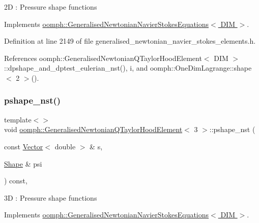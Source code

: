 2D \+: Pressure shape functions 

Implements \hyperlink{classoomph_1_1GeneralisedNewtonianNavierStokesEquations_a84735d21f3d1ade819726a71a7b462e1}{oomph\+::\+Generalised\+Newtonian\+Navier\+Stokes\+Equations$<$ D\+I\+M $>$}.



Definition at line 2149 of file generalised\+\_\+newtonian\+\_\+navier\+\_\+stokes\+\_\+elements.\+h.



References oomph\+::\+Generalised\+Newtonian\+Q\+Taylor\+Hood\+Element$<$ D\+I\+M $>$\+::dpshape\+\_\+and\+\_\+dptest\+\_\+eulerian\+\_\+nst(), i, and oomph\+::\+One\+Dim\+Lagrange\+::shape$<$ 2 $>$().

\mbox{\label{classoomph_1_1GeneralisedNewtonianQTaylorHoodElement_aafeab4cbc9e3a7873959357b98fe475c}} 
\subsubsection{\texorpdfstring{pshape\+\_\+nst()}{pshape\_nst()}\hspace{0.1cm}{\footnotesize\ttfamily [4/4]}}
{\footnotesize\ttfamily template$<$$>$ \\
void \hyperlink{classoomph_1_1GeneralisedNewtonianQTaylorHoodElement}{oomph\+::\+Generalised\+Newtonian\+Q\+Taylor\+Hood\+Element}$<$ 3 $>$\+::pshape\+\_\+nst (\begin{DoxyParamCaption}\item[{const \hyperlink{classoomph_1_1Vector}{Vector}$<$ double $>$ \&}]{s,  }\item[{\hyperlink{classoomph_1_1Shape}{Shape} \&}]{psi }\end{DoxyParamCaption}) const\hspace{0.3cm}{\ttfamily [inline]}, {\ttfamily [virtual]}}

3D \+: Pressure shape functions 

Implements \hyperlink{classoomph_1_1GeneralisedNewtonianNavierStokesEquations_a84735d21f3d1ade819726a71a7b462e1}{oomph\+::\+Generalised\+Newtonian\+Navier\+Stokes\+Equations$<$ D\+I\+M $>$}.



